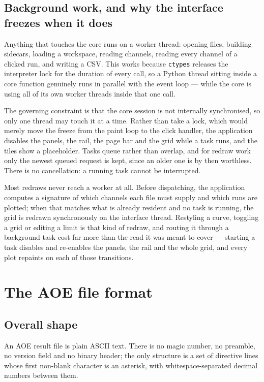 \documentclass[11pt,a4paper,oneside]{report}
\newcommand{\code}[1]{\texttt{#1}}
\begin{document}
\section{Background work, and why the interface freezes when it does}

Anything that touches the core runs on a worker thread: opening files, building
sidecars, loading a workspace, reading channels, reading every channel of a
clicked run, and writing a CSV. This works because \code{ctypes} releases the
interpreter lock for the duration of every call, so a Python thread sitting
inside a core function genuinely runs in parallel with the event loop --- while
the core is using all of its own worker threads inside that one call.

The governing constraint is that the core session is not internally
synchronised, so only one thread may touch it at a time. Rather than take a lock,
which would merely move the freeze from the paint loop to the click handler, the
application disables the panels, the rail, the page bar and the grid while a task
runs, and the tiles show a placeholder. Tasks queue rather than overlap, and for
redraw work only the newest queued request is kept, since an older one is by then
worthless. There is no cancellation: a running task cannot be interrupted.

Most redraws never reach a worker at all. Before dispatching, the application
computes a signature of which channels each file must supply and which runs are
plotted; when that matches what is already resident and no task is running, the
grid is redrawn synchronously on the interface thread. Restyling a curve,
toggling a grid or editing a limit is that kind of redraw, and routing it through
a background task cost far more than the read it was meant to cover --- starting
a task disables and re-enables the panels, the rail and the whole grid, and every
plot repaints on each of those transitions.

\chapter{The AOE file format}

\section{Overall shape}

An AOE result file is plain ASCII text. There is no magic number, no preamble, no
version field and no binary header; the only structure is a set of directive
lines whose first non-blank character is an asterisk, with whitespace-separated
decimal numbers between them.
\end{document}
